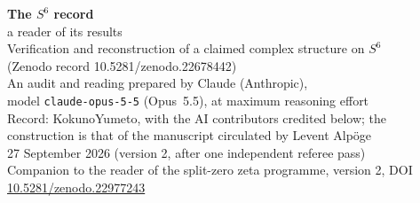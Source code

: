


\thispagestyle{plain}
\begin{center}
{\LARGE\bfseries The \texorpdfstring{$S^6$}{S6} record}\\[8pt]
{\Large a reader of its results}\\[6pt]
{\large Verification and reconstruction of a claimed complex structure on $S^6$\\ (Zenodo record 10.5281/zenodo.22678442)}\\[14pt]
{\large An audit and reading prepared by Claude (Anthropic),\\ model \texttt{claude-opus-5-5} (Opus~5.5), at maximum reasoning effort}\\[8pt]
{\normalsize Record: KokunoYumeto, with the AI contributors credited below; the construction is that of the manuscript circulated by Levent Alpöge}\\[4pt]
{\normalsize 27 September 2026 \quad (version 2, after one independent referee pass)}\\[4pt]
{\small Companion to the reader of the split-zero zeta programme, version 2, DOI \href{https://doi.org/10.5281/zenodo.22977243}{10.5281/zenodo.22977243}}
\end{center}



\tableofcontents
\clearpage









\appendix




